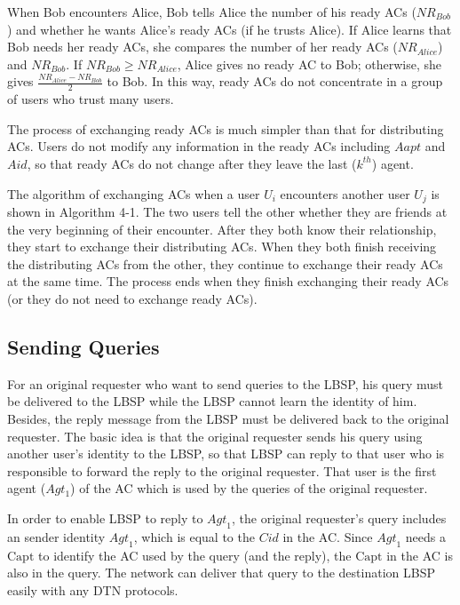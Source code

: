 When Bob encounters Alice, Bob tells Alice the number of his ready ACs (${NR}_{Bob}$) and whether he wants Alice's ready ACs (if he trusts Alice). If Alice learns that Bob needs her ready ACs, she compares the number of her ready ACs (${NR}_{Alice}$) and ${NR}_{Bob}$. If ${NR}_{Bob}\ge {NR}_{Alice}$, Alice gives no ready AC to Bob; otherwise, she gives $\frac{{NR}_{Alice}-{NR}_{Bob}}{2}$ to Bob. In this way, ready ACs do not concentrate in a group of users who trust many users. 

The process of exchanging ready ACs is much simpler than that for distributing ACs. Users do not modify any information in the ready ACs including $Aapt$ and $Aid$, so that ready ACs do not change after they leave the last ($k^{th}$) agent.

The algorithm of exchanging ACs when a user $U_i$ encounters another user $U_j$ is shown in Algorithm 4-1. The two users tell the other whether they are friends at the very beginning of their encounter. After they both know their relationship, they start to exchange their distributing ACs. When they both finish receiving the distributing ACs from the other, they continue to exchange their ready ACs at the same time. The process ends when they finish exchanging their ready ACs (or they do not need to exchange ready ACs).

\subsection{ Sending Queries}

\noindent For an original requester who want to send queries to the LBSP, his query must be delivered to the LBSP while the LBSP cannot learn the identity of him. Besides, the reply message from the LBSP must be delivered back to the original requester. The basic idea is that the original requester sends his query using another user's identity to the LBSP, so that LBSP can reply to that user who is responsible to forward the reply to the original requester. That user is the first agent ($Agt_1$) of the AC which is used by the queries of the original requester.

In order to enable LBSP to reply to ${Agt}_1$, the original requester's query includes an sender identity ${Agt}_1$, which is equal to the $Cid$ in the AC. Since ${Agt}_1$ needs a $\mathrm{Capt}$ to identify the AC used by the query (and the reply), the $\mathrm{Capt}$ in the AC is also in the query. The network can deliver that query to the destination LBSP easily with any DTN protocols.

